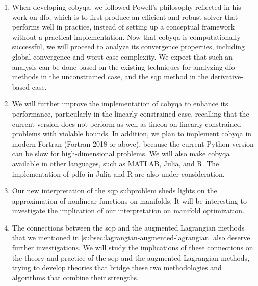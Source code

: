 \begin{enumerate}
    \item When developing \gls{cobyqa}, we followed Powell's philosophy reflected in his work on \gls{dfo}, which is to first produce an efficient and robust solver that performs well in practice, instead of setting up a conceptual framework without a practical implementation. 
    Now that \gls{cobyqa} is computationally successful, we will proceed to analyze its convergence properties, including global convergence and worst-case complexity.
    We expect that such an analysis can be done based on the existing techniques for analyzing \gls{dfo} methods in the unconstrained case, and the \gls{sqp} method in the derivative-based case.
    \item We will further improve the implementation of \gls{cobyqa} to enhance its performance, particularly in the linearly constrained case, recalling that the current version does not perform as well as \gls{lincoa} on linearly constrained problems with violable bounds.
    In addition, we plan to implement \gls{cobyqa} in modern Fortran (Fortran 2018 or above), because the current Python version can be slow for high-dimensional problems.
    We will also make \gls{cobyqa} available in other languages, such as MATLAB, Julia, and R.
    The implementation of \gls{pdfo} in Julia and R are also under consideration.
    \item Our new interpretation of the \gls{sqp} subproblem sheds lights on the approximation of nonlinear functions on manifolds.
    It will be interesting to investigate the implication of our interpretation on manifold optimization.
    \item The connections between the \gls{sqp} and the augmented Lagrangian methods that we mentioned in \cref{subsec:lagrangian-augmented-lagrangian} also deserve further investigations.
    We will study the implications of these connections on the theory and practice of the \gls{sqp} and the augmented Lagrangian methods, trying to develop theories that bridge these two methodologies and algorithms that combine their strengths.

\end{enumerate}
